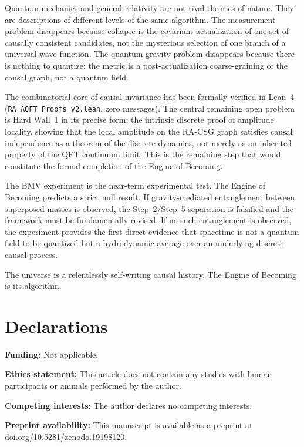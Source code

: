 \documentclass[11pt,a4paper]{article}
\theoremstyle{plain}
\theoremstyle{definition}
\theoremstyle{remark}
\begin{document}
Quantum mechanics and general relativity are not rival theories of nature.
They are descriptions of different levels of the same algorithm. The
measurement problem disappears because collapse is the covariant actualization
of one set of causally consistent candidates, not the mysterious selection of
one branch of a universal wave function. The quantum gravity problem
disappears because there is nothing to quantize: the metric is a
post-actualization coarse-graining of the causal graph, not a quantum field.

The combinatorial core of causal invariance has been formally verified in
Lean~4 (\texttt{RA\_AQFT\_Proofs\_v2.lean}, zero messages). The central
remaining open problem is Hard Wall~1 in its precise form: the intrinsic
discrete proof of amplitude locality, showing that the local amplitude on the
RA-CSG graph satisfies causal independence as a theorem of the discrete
dynamics, not merely as an inherited property of the QFT continuum limit.
This is the remaining step that would constitute the formal completion of the
Engine of Becoming.

The BMV experiment is the near-term experimental test. The Engine of Becoming
predicts a strict null result. If gravity-mediated entanglement between
superposed masses is observed, the Step~2/Step~5 separation is falsified and
the framework must be fundamentally revised. If no such entanglement is
observed, the experiment provides the first direct evidence that spacetime is
not a quantum field to be quantized but a hydrodynamic average over an
underlying discrete causal process.

The universe is a relentlessly self-writing causal history.
The Engine of Becoming is its algorithm.


\section*{Declarations}
\textbf{Funding:} Not applicable.

\textbf{Ethics statement:} This article does not contain any studies with human participants or animals performed by the author.

\quad
\textbf{Competing interests:} The author declares no competing interests.

\textbf{Preprint availability:} This manuscript is available as a preprint at
\href{https://doi.org/10.5281/zenodo.19198120}{doi.org/10.5281/zenodo.19198120}.
\end{document}
